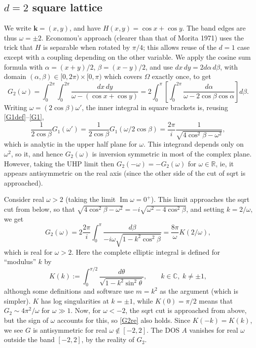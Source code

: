 \documentclass[11pt]{article}
\newcommand{\be}{\begin{equation}}
\newcommand{\ee}{\end{equation}}
\newcommand{\mbf}[1]{{\mathbf #1}}
\newcommand{\R}{\mathbb{R}}
\newcommand{\C}{\mathbb{C}}
\DeclareMathOperator{\im}{Im}
\newcommand{\om}{\omega}
\newcommand{\kk}{\mbf{k}}
\newcommand{\al}{\alpha}
\newcommand{\bt}{\beta}
\begin{document}
\subsection{$d=2$ square lattice}
\label{s:2d}

We write $\kk=(x,y)$, and have $H(x,y) = \cos x + \cos y$. The band edges
are thus $\om = \pm 2$.
Economou's approach (clearer than that of Morita 1971) uses the trick that
$H$ is separable when rotated by $\pi/4$; this allows reuse of the $d=1$
case except with a coupling depending on the other variable.
We apply the cosine sum formula with $\al = (x+y)/2$,
$\bt = (x-y)/2$, and use $dx\,dy = 2 d\al\,d\bt$, with domain
$(\al,\bt) \in [0,2\pi)\times[0,\pi)$ which covers $\Omega$ exactly once,
to get
\be
G_2(\om) = \int_0^{2\pi} \int_0^{2\pi} \frac{dx\,dy}{\om - (\cos x + \cos y)}
=
2 \int_0^{\pi} \left[ \int_0^{2\pi} \frac{d\al}{\om - 2\cos\bt\cos\al} \right]
d\bt.
\ee
Writing $\om=(2\cos\bt)\om'$, the inner integral in square brackets
is, reusing \eqref{G1def}--\eqref{G1},
\[
\frac{1}{2\cos\bt}G_1(\om') = 
\frac{1}{2\cos\bt}G_1(\om/2\cos\bt) =
\frac{2\pi}{i}\frac{1}{\sqrt{4\cos^2\bt - \om^2}},
\]
which is analytic in the upper half plane for $\om$.
This integrand depends only on $\om^2$, so it, and hence
$G_2(\om)$ is inversion symmetric in most of the complex plane.
However, taking the UHP limit then $G_2(-\om) = -G_2(\om)$
for $\om\in\R$, ie, it appears antisymmetric on the real axis
(since the other side of the cut of sqrt is approached).

Consider real $\om>2$ (taking the limit $\im \om = 0^+$).
This limit approaches the sqrt cut from below, so that
$\sqrt{4\cos^2\bt - \om^2} = -i\sqrt{\om^2 - 4\cos^2\bt}$, and
setting $k=2/\om$, we get
\be
G_2(\om) = 2 \frac{2\pi}{i} \int_0^{\pi} \frac{d\bt}{-i \om \sqrt{1-k^2\cos^2\bt}}
= \frac{8\pi}{\om}K(2/\om),
\label{G2re}
\ee
which is real for $\om>2$.
Here the complete elliptic integral is defined for ``modulus'' $k$ by
\be
K(k) := \int_0^{\pi/2} \frac{d\theta}{\sqrt{1-k^2\sin^2 \theta}},
\qquad k\in\C, \; k\neq \pm 1,
\label{ellipk}
\ee
although some definitions and software use $m=k^2$ as the argument
(which is simpler).
$K$ has log singularities at $k=\pm 1$, while $K(0) = \pi/2$
means that $G_2 \sim 4\pi^2/\om$ for $\om\gg 1$.
Now, for $\om<-2$, the sqrt cut is approached from above,
but the sign of $\om$ accounts for this, so \eqref{G2re} also holds.
Since $K(-k) = K(k)$, we see $G$ is antisymmetric for real $\om\notin[-2,2]$.
The DOS $A$
vanishes for real $\om$ outside the band $[-2,2]$, by the reality of $G_2$.
\end{document}
